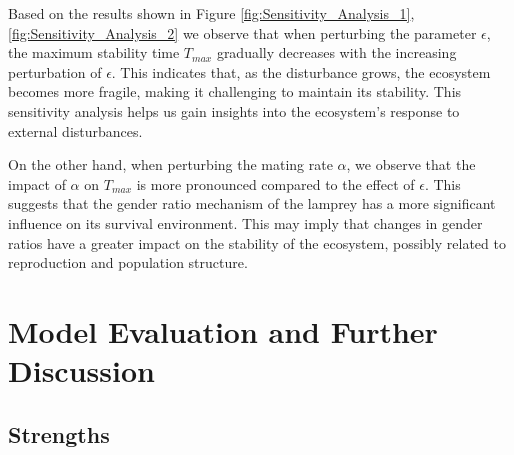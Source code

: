 \documentclass[CTeX = true]{mcmthesis}  %
\begin{document}
Based on the results shown in Figure \ref{fig:Sensitivity_Analysis_1}, \ref{fig:Sensitivity_Analysis_2} we observe that when perturbing the parameter $\epsilon$, the maximum stability time $T_{max}$ gradually decreases with the increasing perturbation of $\epsilon$. This indicates that, as the disturbance grows, the ecosystem becomes more fragile, making it challenging to maintain its stability. This sensitivity analysis helps us gain insights into the ecosystem's response to external disturbances.

On the other hand, when perturbing the mating rate $\alpha$, we observe that the impact of $\alpha$ on $T_{max}$ is more pronounced compared to the effect of $\epsilon$. This suggests that the gender ratio mechanism of the lamprey has a more significant influence on its survival environment. This may imply that changes in gender ratios have a greater impact on the stability of the ecosystem, possibly related to reproduction and population structure.

\section{Model Evaluation and Further Discussion}

\subsection{Strengths}
\end{document}
